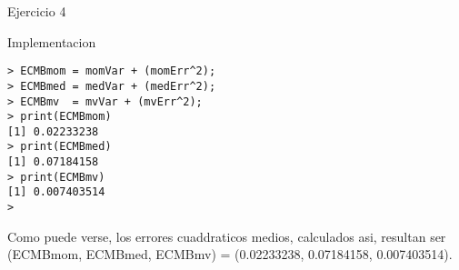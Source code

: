 \begin{section}{Ejercicio 4}
\begin{subsection}{Implementacion}
\begin{verbatim}
> ECMBmom = momVar + (momErr^2);
> ECMBmed = medVar + (medErr^2);
> ECMBmv  = mvVar + (mvErr^2);
> print(ECMBmom)
[1] 0.02233238
> print(ECMBmed)
[1] 0.07184158
> print(ECMBmv)
[1] 0.007403514
> 
\end{verbatim}

Como puede verse, los errores cuaddraticos medios, calculados asi, resultan ser  (ECMBmom, ECMBmed, ECMBmv) = (0.02233238, 0.07184158, 0.007403514).


\end{subsection}
\end{section}